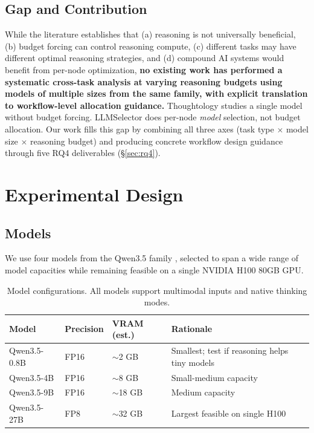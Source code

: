 \documentclass[11pt]{article}
\begin{document}
\subsection{Gap and Contribution}

While the literature establishes that (a) reasoning is not universally beneficial, (b) budget forcing can control reasoning compute, (c) different tasks may have different optimal reasoning strategies, and (d) compound AI systems would benefit from per-node optimization, \textbf{no existing work has performed a systematic cross-task analysis at varying reasoning budgets using models of multiple sizes from the same family, with explicit translation to workflow-level allocation guidance.} Thoughtology \citep{marjanovic2025thoughtology} studies a single model without budget forcing. LLMSelector \citep{chen2025llmselector} does per-node \emph{model} selection, not budget allocation. Our work fills this gap by combining all three axes (task type $\times$ model size $\times$ reasoning budget) and producing concrete workflow design guidance through five RQ4 deliverables (\S\ref{sec:rq4}).

\section{Experimental Design}

\subsection{Models}

We use four models from the Qwen3.5 family \citep{yang2025qwen3}, selected to span a wide range of model capacities while remaining feasible on a single NVIDIA H100 80GB GPU.

\begin{table}[h]
\centering
\caption{Model configurations. All models support multimodal inputs and native thinking modes.}
\label{tab:models}
\begin{tabular}{@{}llll@{}}
\toprule
\textbf{Model} & \textbf{Precision} & \textbf{VRAM (est.)} & \textbf{Rationale} \\
\midrule
Qwen3.5-0.8B & FP16 & $\sim$2 GB & Smallest; test if reasoning helps tiny models \\
Qwen3.5-4B & FP16 & $\sim$8 GB & Small-medium capacity \\
Qwen3.5-9B & FP16 & $\sim$18 GB & Medium capacity \\
Qwen3.5-27B & FP8 & $\sim$32 GB & Largest feasible on single H100 \\
\bottomrule
\end{tabular}
\end{table}
\end{document}
